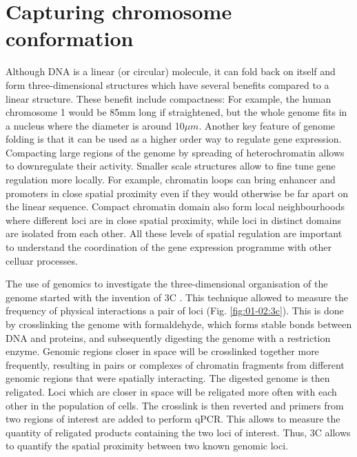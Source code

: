 \section{Capturing chromosome conformation}

Although DNA is a linear (or circular) molecule, it can fold back on itself and form three-dimensional structures which have several benefits compared to a linear structure. These benefit include compactness: For example, the human chromosome 1 would be 85mm long if straightened, but the whole genome fits in a nucleus where the diameter is around 10$\mu m$. Another key feature of genome folding is that it can be used as a higher order way to regulate gene expression. Compacting large regions of the genome by spreading of heterochromatin allows to downregulate their activity. Smaller scale structures allow to fine tune gene regulation more locally. For example, chromatin loops can bring enhancer and promoters in close spatial proximity even if they would otherwise be far apart on the linear sequence. Compact chromatin domain also form local neighbourhoods where different loci are in close spatial proximity, while loci in distinct domains are isolated from each other. All these levels of spatial regulation are important to understand the coordination of the gene expression programme with other celluar processes.

The use of genomics to investigate the three-dimensional organisation of the genome started with the invention of \acrfull{3C} \cite{Dekker2002}. This technique allowed to measure the frequency of physical interactions a pair of loci (Fig. \ref{fig:01-02:3c}). This is done by crosslinking the genome with formaldehyde, which forms stable bonds between DNA and proteins, and subsequently digesting the genome with a restriction enzyme. Genomic regions closer in space will be crosslinked together more frequently, resulting in pairs or complexes of chromatin fragments from different genomic regions that were spatially interacting. The digested genome is then religated. Loci which are closer in space will be religated more often with each other in the population of cells. The crosslink is then reverted and primers from two regions of interest are added to perform qPCR. This allows to measure the quantity of religated products containing the two loci of interest. Thus, 3C allows to quantify the spatial proximity between two known genomic loci. 


